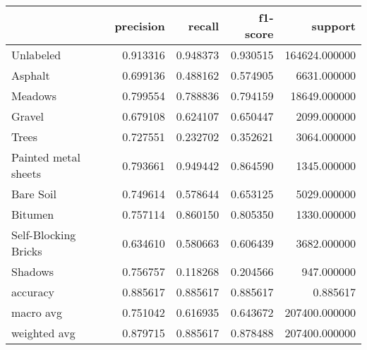 \begin{tabular}{lrrrr}
\toprule
{} &  precision &    recall &  f1-score &        support \\
\midrule
Unlabeled            &   0.913316 &  0.948373 &  0.930515 &  164624.000000 \\
Asphalt              &   0.699136 &  0.488162 &  0.574905 &    6631.000000 \\
Meadows              &   0.799554 &  0.788836 &  0.794159 &   18649.000000 \\
Gravel               &   0.679108 &  0.624107 &  0.650447 &    2099.000000 \\
Trees                &   0.727551 &  0.232702 &  0.352621 &    3064.000000 \\
Painted metal sheets &   0.793661 &  0.949442 &  0.864590 &    1345.000000 \\
Bare Soil            &   0.749614 &  0.578644 &  0.653125 &    5029.000000 \\
Bitumen              &   0.757114 &  0.860150 &  0.805350 &    1330.000000 \\
Self-Blocking Bricks &   0.634610 &  0.580663 &  0.606439 &    3682.000000 \\
Shadows              &   0.756757 &  0.118268 &  0.204566 &     947.000000 \\
accuracy             &   0.885617 &  0.885617 &  0.885617 &       0.885617 \\
macro avg            &   0.751042 &  0.616935 &  0.643672 &  207400.000000 \\
weighted avg         &   0.879715 &  0.885617 &  0.878488 &  207400.000000 \\
\bottomrule
\end{tabular}
